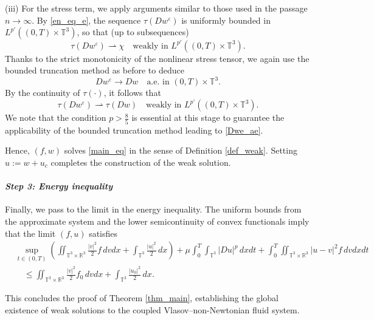 \documentclass[10pt,reqno]{amsart}
\numberwithin{equation}{section}
\newcommand{\R}{\mathbb R}
\newcommand{\T}{\mathbb T}
\newcommand{\e}{\varepsilon}
\newcommand{\intt}{\int_{\T^3}}
\newcommand{\inttr}{\iint_{\T^3 \times \R^3}}
\begin{document}
\medskip

\noindent (iii)  For the stress term, we apply arguments similar to those used in the passage $n \to \infty$. By \eqref{en_eq_e}, the sequence
 $\tau(Dw^{\e})$ is uniformly bounded in $L^{p'}((0,T) \times \T^3)$, so that (up to subsequences) 
 \[
 \tau(Dw^{\e}) {\rightharpoonup}  \chi  \quad \mbox{weakly in }  L^{p'}((0,T) \times \T^3). 
 \]
 Thanks to the strict monotonicity of the nonlinear stress tensor, we again use the bounded truncation method as before to deduce
    \begin{equation}\label{Dwe_ae}
 	Dw^{\e} \to Dw \quad \mbox{a.e. in }(0,T) \times \T^3.
    \end{equation}
By the continuity of $\tau (\cdot)$, it follows that
\[
\tau(Dw^\e) \rightharpoonup \tau(Dw) \quad \text{weakly in }L^{p'}((0,T) \times \T^3).
\]
We note that the condition $p > \frac{8}{5}$ is essential at this stage to guarantee the applicability of the bounded truncation method leading to \eqref{Dwe_ae}.  
 
Hence, $(f, w)$ solves \eqref{main_eq} in the sense of Definition \ref{def_weak}. Setting $u := w + u_c$ completes the construction of the weak solution.

\medskip

\paragraph{\it Step 3: Energy inequality}

Finally, we pass to the limit in the energy inequality. The uniform bounds from the approximate system and the lower semicontinuity of convex functionals imply that the limit $(f, u)$ satisfies
\[
\begin{aligned}
&\sup_{t \in (0,T)}\left( \inttr \frac{|v|^2}{2} f\,dvdx + \intt \frac{|u|^2}{2}\,dx \right) +  \mu\int_0^T \intt   |D u|^p\,dxdt  + \int_0^T \inttr |u-v|^2 f\,dvdxdt \\
&\quad \le \inttr \frac{|v|^2}{2} f_0\,dvdx + \intt \frac{|u_0|^2}{2}\,dx.
\end{aligned}
\]

This concludes the proof of Theorem \ref{thm_main}, establishing the global existence of weak solutions to the coupled Vlasov--non-Newtonian fluid system.

 


%
%
%  
%
%
\end{document}
